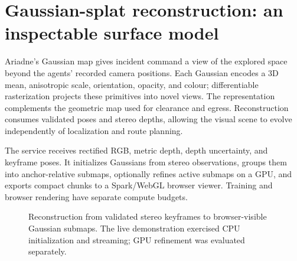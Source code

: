 \documentclass[10pt,a4paper]{article}
\begin{document}
\section{Gaussian-splat reconstruction: an inspectable surface model}

Ariadne's Gaussian map gives incident command a view of the explored
space beyond the agents' recorded camera positions. Each Gaussian
encodes a 3D mean, anisotropic scale, orientation, opacity, and colour;
differentiable rasterization projects these primitives into novel
views. The representation complements the geometric map used for
clearance and egress. Reconstruction consumes validated poses and
stereo depths, allowing the visual scene to evolve independently of
localization and route planning.

The service receives rectified RGB, metric depth, depth uncertainty,
and keyframe poses. It initializes Gaussians from stereo observations,
groups them into anchor-relative submaps, optionally refines active
submaps on a GPU, and exports compact chunks to a Spark/WebGL browser
viewer. Training and browser rendering have separate compute budgets.

\begin{figure}[t]
\centering
{}
\caption{Reconstruction from validated stereo keyframes to browser-visible
Gaussian submaps. The live demonstration exercised CPU initialization and
streaming; GPU refinement was evaluated separately.}
\label{fig:splat-pipeline}
\end{figure}
\end{document}
